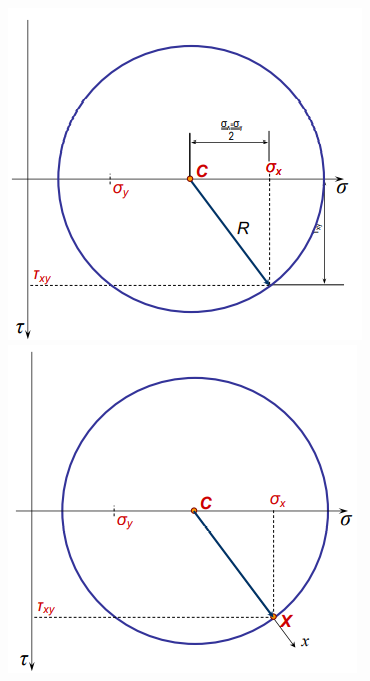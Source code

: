 \documentclass[class=report, crop=false, 12pt,a4paper]{standalone}
\begin{document}
\begin{figure}[H]
    \begin{minipage}{0.25\textwidth}
        \centering
        \includegraphics[width=\textwidth]{../img/diagram55.png}   
    \end{minipage}
    \begin{minipage}{0.25\textwidth}
        \centering
        \includegraphics[width=\textwidth]{../img/diagram56.png}   
    \end{minipage}
    \caption{}
\end{figure}
\end{document}
